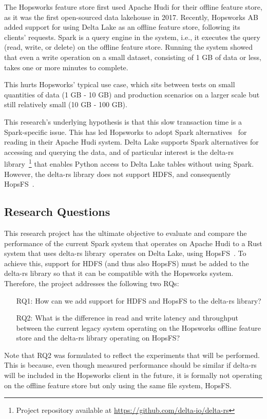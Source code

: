 The Hopsworks feature store \cite{10.1145/3626246.3653389} first used Apache Hudi for their offline feature store, as it was the first open-sourced data lakehouse in 2017. Recently, Hopsworks \gls{AB} added support for using Delta Lake as an offline feature store, following its clients' requests. Spark is a query engine in the system, i.e., it executes the query (read, write, or delete) on the offline feature store. Running the system showed that even a write operation on a small dataset, consisting of 1 GB of data or less, takes one or more minutes to complete.

This hurts Hopsworks' typical use case, which sits between tests on small quantities of data (1 GB - 10 GB) and production scenarios on a larger scale but still relatively small (10 GB - 100 GB).

This research's underlying hypothesis is that this slow transaction time is a Spark-specific issue. This has led Hopsworks to adopt Spark alternatives~\cite{Khazanchi1801362} for reading in their Apache Hudi system. Delta Lake supports Spark alternatives for accessing and querying the data, and of particular interest is the delta-rs library~\footnote{Project repository available at \url{https://github.com/delta-io/delta-rs}} that enables Python access to Delta Lake tables without using Spark. 
However, the delta-rs library does not support \gls{HDFS}, and consequently \gls{HopsFS}~\cite{niaziHopsFSScalingHierarchical2017}.

\subsection{Research Questions}
\label{subsec:researchQuestion}
This research project has the ultimate objective to evaluate and compare the performance of the current Spark system that operates on Apache Hudi to a Rust system that uses delta-rs library~\footnotemark[\value{footnote}] operates on Delta Lake, using \gls{HopsFS}~\cite{niaziHopsFSScalingHierarchical2017}. To achieve this, support for \gls{HDFS} (and thus also \gls{HopsFS}) must be added to the delta-rs library so that it can be compatible with the Hopsworks system. Therefore, the project addresses the following two \glspl{RQ}:
\begin{enumerate}
    \item[RQ1:] How can we add support for \gls{HDFS} and \gls{HopsFS} to the delta-rs library?
    \item[RQ2:] What is the difference in read and write latency and throughput between the current legacy system operating on the Hopsworks offline feature store and the delta-rs library operating on HopsFS?
\end{enumerate}
Note that RQ2 was formulated to reflect the experiments that will be performed. This is because, even though measured performance should be similar if delta-rs will be included in the Hopsworks client in the future, it is formally not operating on the offline feature store but only using the same file system, \gls{HopsFS}.

